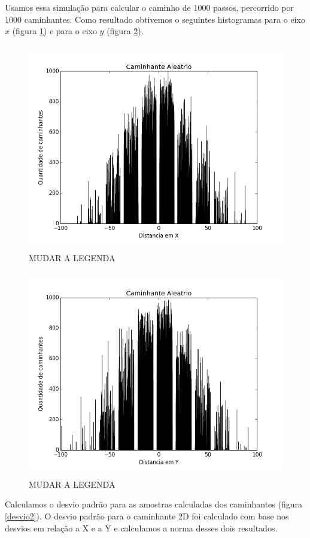 \documentclass[12pt,a4paper]{article}
\begin{document}
Usamos essa simulação para calcular o caminho de 1000 passos, percorrido por 1000 caminhantes. Como resultado obtivemos o seguintes histogramas para o eixo $x$ (figura \ref{histograma2x}) e para o eixo $y$ (figura \ref{histograma2y}).

\begin{figure}[H]
\centering
\includegraphics[width=12cm,height=9cm]{imgs/2d/histograma_X.png}
\caption{MUDAR A LEGENDA}
\label{histograma2x}
\end{figure}

\begin{figure}[H]
\centering
\includegraphics[width=12cm,height=9cm]{imgs/2d/histograma_y.png}
\caption{MUDAR A LEGENDA}
\label{histograma2y}
\end{figure}


Calculamos o desvio padrão para as amostras calculadas dos caminhantes (figura \ref{desvio2}). O desvio padrão para o caminhante 2D foi calculado com base nos desvios em relação a X e a Y e calculamos a norma desses dois resultados.
\end{document}
